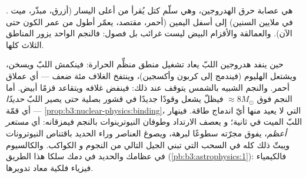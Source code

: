 \begin{omfigure}

{\small {}.  هي
عصابة حرق الهدروجين، وهي سلّم كتل يُقرأ من أعلى اليسار (أزرق،
مبذّر، ميت في ملايين السنين) إلى أسفل اليمين (أحمر، مقتصد،
يعمّر أطول من عمر الكون حتى الآن). والعمالقة والأقزام البيض ليست
غرائب بل فصول: فالنجم الواحد يزور المناطق الثلاث كلها.}
\end{omfigure}

\begin{remark}\label{rem:b3:astrophysics:evolution}
حين ينفد هدروجين اللبّ يعاد تشغيل منطق منظِّم الحرارة:
فينكمش اللبّ ويسخن، ويشتعل الهليوم (فيندمج إلى كربون
وأكسجين)، وينتفخ الغلاف مئة ضعف --- أي عملاق أحمر.
والنجم الشبيه بالشمس يتوقف عند ذلك: فينفض غلافه ويتقاعد
قزمًا أبيض. أما النجم فوق $\approx8M_\odot$ فيظلّ يشعل
وقودًا جديدًا في قشور بصلية حتى يصير اللبّ \emph{حديدًا} ---
أي قمّة \cref{prop:b3:nuclear-physics:binding}، التي لا يعيد
منها أيّ اندماج طاقة. فينهار اللبّ الميت في ثانية؛ و
يعصف الارتداد وطوفان النيوترينوات بالنجم فيمزقانه: أي
\emph{مستعر أعظم}، يفوق مجرّته سطوعًا لبرهة، ويصوغ
العناصر وراء الحديد باقتناص النيوترونات ويبثّ ذلك كله
في السحب التي تبني الجيل التالي من النجوم و
الكواكب. والكالسيوم في عظامك والحديد في دمك
سلكا هذا الطريق (\cref{pb:b3:astrophysics:1}): فالكيمياء
فيزياء فلكية معاد تدويرها.
\end{remark}


